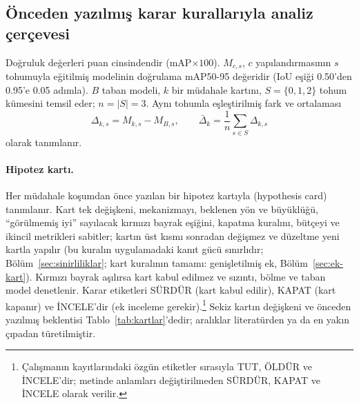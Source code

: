 \documentclass[pdflatex,iicol,sn-mathphys-num]{sn-jnl}
\begin{document}
\subsection{Önceden yazılmış karar kurallarıyla analiz çerçevesi}\label{sec:cerceve}

Doğruluk değerleri puan cinsindendir (mAP$\times100$). $M_{c,s}$, $c$ yapılandırmasının $s$ tohumuyla eğitilmiş modelinin doğrulama mAP50-95 değeridir (IoU eşiği 0.50'den 0.95'e 0.05 adımla). $B$ taban modeli, $k$ bir müdahale kartını, $S=\{0,1,2\}$ tohum kümesini temsil eder; $n=|S|=3$. Aynı tohumla eşleştirilmiş fark ve ortalaması
\begin{equation}\label{eq:delta}
\Delta_{k,s}=M_{k,s}-M_{B,s},\qquad \bar\Delta_k=\frac1n\sum_{s\in S}\Delta_{k,s}
\end{equation}
olarak tanımlanır.

\paragraph{Hipotez kartı.}
Her müdahale koşumdan önce yazılan bir hipotez kartıyla (hypothesis card) tanımlanır. Kart tek değişkeni, mekanizmayı, beklenen yön ve büyüklüğü, ``görülmemiş iyi'' sayılacak kırmızı bayrak eşiğini, kapatma kuralını, bütçeyi ve ikincil metrikleri sabitler; kartın üst kısmı sonradan değişmez ve düzeltme yeni kartla yapılır (bu kuralın uygulamadaki kanıt gücü sınırlıdır; Bölüm~\ref{sec:sinirliliklar}; kart kuralının tamamı: genişletilmiş ek, Bölüm~\ref{sec:ek-kart}). Kırmızı bayrak aşılırsa kart kabul edilmez ve sızıntı, bölme ve taban model denetlenir. Karar etiketleri SÜRDÜR (kart kabul edilir), KAPAT (kart kapanır) ve İNCELE'dir (ek inceleme gerekir).\footnote{Çalışmanın kayıtlarındaki özgün etiketler sırasıyla TUT, ÖLDÜR ve İNCELE'dir; metinde anlamları değiştirilmeden SÜRDÜR, KAPAT ve İNCELE olarak verilir.} Sekiz kartın değişkeni ve önceden yazılmış beklentisi Tablo~\ref{tab:kartlar}'dedir; aralıklar literatürden ya da en yakın çıpadan türetilmiştir.
\end{document}
